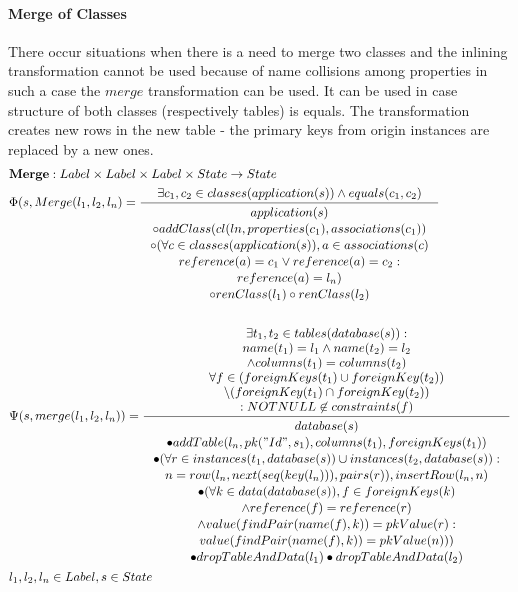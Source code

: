 \documentclass[11pt]{article}
\begin{document}
\paragraph{Merge of Classes} There occur situations when there is a need to merge two classes and the inlining transformation cannot be used because of name collisions among properties in such a case the $merge$ transformation can be used. It can be used in case structure of both classes (respectively tables) is equals. The transformation creates new rows in the new table - the primary keys from origin instances are replaced by a new ones.
\begin{align*}
&	\mathbf{Merge} : Label \times Label \times Label \times State \rightarrow State \\
&	\Phi(s, Merge(l_1, l_2, l_n) = \inference{
		\exists c_1, c_2 \in classes(application(s)) \wedge 
		equals(c_1, c_2)}{\begin{gathered}
			application(s) \\ \circ addClass(cl(ln, properties(c_1), associations(c_1)) \\
			\circ (\forall c \in classes (application(s)), a \in associations(c) \\
			reference(a) = c_1 \vee reference(a) = c_2 : \\
			reference(a) = l_n) \\
			\circ renClass(l_1) \circ renClass(l_2) \end{gathered}}
 \\\\
&	\Psi(s, merge(l_1, l_2, l_n)) = \inference{\exists t_1, t_2 \in tables(database(s)) : \\ name(t_1) = l_1 \wedge name(t_2) = l_2 \\ \wedge columns(t_1) = columns(t_2)\\
\forall f \in (foreignKeys(t_1) \cup foreignKey(t_2)) \\ \setminus (foreignKey(t_1) \cap foreignKey(t_2)) \\ : NOTNULL \not \in constraints(f)  }{\begin{gathered}
	 database(s) \\ \bullet addTable(l_n, pk("Id", s_1), columns(t_1), foreignKeys(t_1)) \\ 
\bullet (\forall r \in instances(t_1, database(s)) \cup instances(t_2, database(s)) :  \\ n =  row(l_n, next(seq(key(l_n))), pairs(r)), insertRow(l_n, n) \\ 
\bullet (\forall k \in data(database(s)), f \in foreignKeys(k) \\ \wedge reference(f) = reference(r) \\ \wedge value(findPair(name(f), k)) = pkValue(r) : \\value(findPair(name(f), k)) = pkValue(n))) \\  \bullet dropTableAndData(l_1) \bullet dropTableAndData(l_2)
 \end{gathered}} \\
 & l_1, l_2, l_n \in Label, s \in State
\end{align*}
\end{document}
